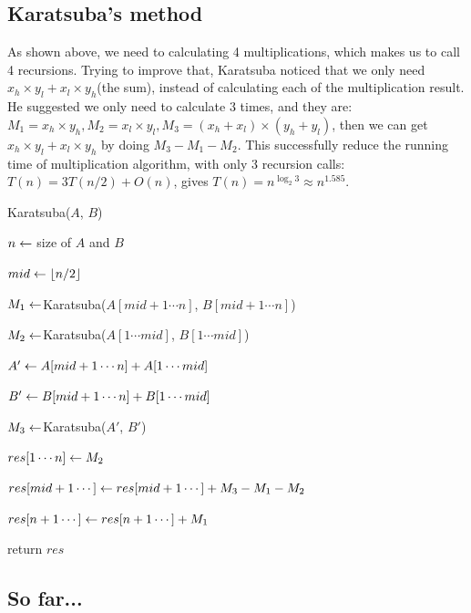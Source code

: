 \begin{spacing}{1.3}
    \subsection{Karatsuba's method}

    As shown above, we need to calculating 4 multiplications,
    which makes us to call 4 recursions. Trying to improve that, 
    Karatsuba noticed that we only need $x_h\times y_l+x_l\times y_h$(the sum),
    instead of calculating each of the multiplication result.
    He suggested we only need to calculate 3 times, and they are:
    $M_1=x_h\times y_h, M_2=x_l\times y_l, M_3=(x_h+x_l)\times 
    (y_h+y_l)$, then we can get $x_h\times y_l+x_l\times y_h$ 
    by doing $M_3-M_1-M_2$. This successfully reduce the 
    running time of multiplication algorithm, with only 3 
    recursion calls:
    $T(n)=3T(n/2)+O(n)$, gives $T(n)=n^{\log_2 3}\approx n^{1.585}$.

    \begin{algorithm}
        \caption{Karatsuba($A$, $B$)}

        $n\leftarrow $ size of $A$ and $B$


        $mid\leftarrow \lfloor n/2 \rfloor$

        $M_1\leftarrow $Karatsuba($A[mid+1\cdots n]$, $B[mid+1\cdots n]$)
        \qquad {}

        $M_2\leftarrow $Karatsuba($A[1\cdots mid]$, $B[1\cdots mid]$)
        \qquad {}

        $A'\leftarrow A[mid+1\cdots n]+A[1\cdots mid]$

        $B'\leftarrow B[mid+1\cdots n]+B[1\cdots mid]$

        $M_3\leftarrow $Karatsuba($A'$, $B'$)
        \qquad {}


        $res[1\cdots n]\leftarrow M_2$

        $res[mid+1\cdots ]\leftarrow res[mid+1\cdots] +M_3-M_1-M_2$

        $res[n+1\cdots]\leftarrow res[n+1\cdots]+M_1$

        return $res$
    \end{algorithm}

    \subsection{So far...}


\end{spacing}
